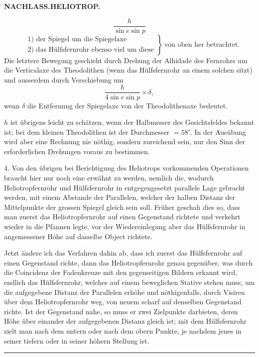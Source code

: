 \clearpage
\noindent{}\hfill{\small\textbf{NACHLASS.\quad HELIOTROP.}}\hfill\null\par
\[
\frac{h}{\sin e\sin p}
\]
\[
\left.\begin{aligned}
&\text{1) der Spiegel um die Spiegelaxe}\\
&\text{2) das Hülfsfernrohr ebenso viel um diese}
\end{aligned}\right\}\ \text{von oben her betrachtet.}
\]
Die letztere Bewegung geschieht durch Drehung der Alhidade des Fernrohrs
um die Verticalaxe des Theodolithen (wenn das Hülfsfernrohr an einem
solchen sitzt) und ausserdem durch Verschiebung um
\[
\frac{h}{4\sin e\sin p}\times\delta,
\]
wenn $\delta$ die Entfernung der Spiegelaxe von der Theodolithenaxe bedeutet.

$h$ ist übrigens leicht zu schätzen, wenn der Halbmesser des Gesichtsfeldes
bekannt ist; bei dem kleinen Theodolithen ist der Durchmesser $=58'$.
In der Ausübung wird aber eine Rechnung nie nöthig, sondern zureichend sein,
nur den Sinn der erforderlichen Drehungen voraus zu bestimmen.

4. Von den übrigen bei Berichtigung des Heliotrops vorkommenden
Operationen braucht hier nur noch eine erwähnt zu werden, nemlich die, wodurch
Heliotropfernrohr und Hülfsfernrohr in entgegengesetzt parallele Lage
gebracht werden, mit einem Abstande der Parallelen, welcher der halben Distanz
der Mittelpunkte der grossen Spiegel gleich sein soll. Früher geschah
dies so, dass man zuerst das Heliotropfernrohr auf einen Gegenstand richtete
und verkehrt wieder in die Pfannen legte, vor der Wiedereinlegung aber das
Hülfsfernrohr in angemessener Höhe auf dasselbe Object richtete.

Jetzt ändere ich das Verfahren dahin ab, dass ich zuerst das Hülfsfernrohr
auf einen Gegenstand richte, dann das Heliotropfernrohr genau gegenüber,
was durch die Coincidenz der Fadenkreuze mit den gegenseitigen Bildern
erkannt wird, endlich das Hülfsfernrohr, welches auf einem beweglichen
Stative stehen muss, um die aufgegebene Distanz der Parallelen erhöhe und
nöthigenfalls, durch Visiren über dem Heliotropfernrohr weg, von neuem
scharf auf denselben Gegenstand richte. Ist der Gegenstand nahe, so muss
er zwei Zielpunkte darbieten, deren Höhe über einander der aufgegebenen
Distanz gleich ist; mit dem Hülfsfernrohr zielt man nach dem untern oder
nach dem obern Punkte, je nachdem jenes in seiner tiefern oder in seiner
höhern Stellung ist.
\begin{center}\rule{30mm}{.4pt}\end{center}

